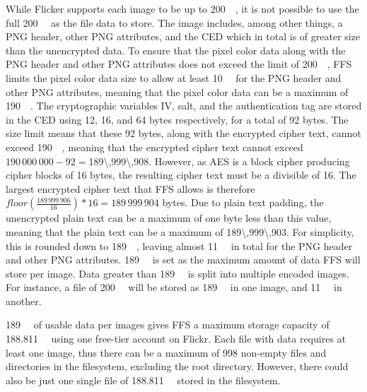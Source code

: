 While Flicker supports each image to be up to \SI{200}{\mega\byte}, it is not possible to use the full \SI{200}{\mega\byte} as the file data to store. The image includes, among other things, a PNG header, other PNG attributes, and the CED which in total is of greater size than the unencrypted data. To ensure that the pixel color data along with the PNG header and other PNG attributes does not exceed the limit of \SI{200}{\mega\byte}, FFS limits the pixel color data size to allow at least \SI{10}{\mega\byte} for the PNG header and other PNG attributes, meaning that the pixel color data can be a maximum of \SI{190}{\mega\byte}. The cryptographic variables IV, salt, and the authentication tag are stored in the CED using 12, 16, and 64 bytes respectively, for a total of 92 bytes. The size limit means that these 92 bytes, along with the encrypted cipher text, cannot exceed \SI{190}{\mega\byte}, meaning that the encrypted cipher text cannot exceed $190\,000\,000 - 92 = $\SI{189\,999\,908}{\byte}. However, as AES is a block cipher producing cipher blocks of 16 bytes, the resulting cipher text must be a divisible of 16. The largest encrypted cipher text that FFS allows is therefore $floor(\frac{189\,999\,906}{16})*16 = 189\,999\,904$ bytes. Due to plain text padding, the unencrypted plain text can be a maximum of one byte less than this value, meaning that the plain text can be a maximum of \SI{189\,999\,903}{\byte}. For simplicity, this is rounded down to \SI{189}{\mega\byte}, leaving almost \SI{11}{\mega\byte} in total for the PNG header and other PNG attributes. \SI{189}{\mega\byte} is set as the maximum amount of data FFS will store per image. Data greater than \SI{189}{\mega\byte} is split into multiple encoded images. For instance, a file of \SI{200}{\mega\byte} will be stored as \SI{189}{\mega\byte} in one image, and \SI{11}{\mega\byte} in another. 

\SI{189}{\mega\byte} of usable data per images gives FFS a maximum storage capacity of \SI{188.811}{\giga\byte} using one free-tier account on Flickr. Each file with data requires at least one image, thus there can be a maximum of 998 non-empty files and directories in the filesystem, excluding the root directory. However, there could also be just one single file of \SI{188.811}{\giga\byte} stored in the filesystem.

